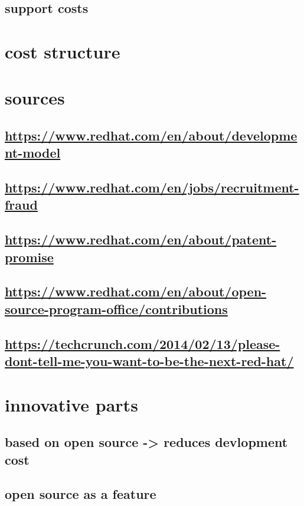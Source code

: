 \documentclass[letterpaper]{article}
\begin{document}
\subsection{support costs}
\label{sec:org131d14a}
\section{cost structure}
\label{sec:org943a611}
\section{sources}
\label{sec:org57c451d}
\subsection{\url{https://www.redhat.com/en/about/development-model}}
\label{sec:org2fb2f52}
\subsection{\url{https://www.redhat.com/en/jobs/recruitment-fraud}}
\label{sec:org511b551}
\subsection{\url{https://www.redhat.com/en/about/patent-promise}}
\label{sec:org0a487b6}
\subsection{\url{https://www.redhat.com/en/about/open-source-program-office/contributions}}
\label{sec:org3a627a7}
\subsection{\url{https://techcrunch.com/2014/02/13/please-dont-tell-me-you-want-to-be-the-next-red-hat/}}
\label{sec:org128437c}
\section{innovative parts}
\label{sec:org63730ec}
\subsection{based on open source -> reduces devlopment cost}
\label{sec:org863a8f9}
\subsection{open source as a feature}
\label{sec:org7b542d9}
\end{document}
